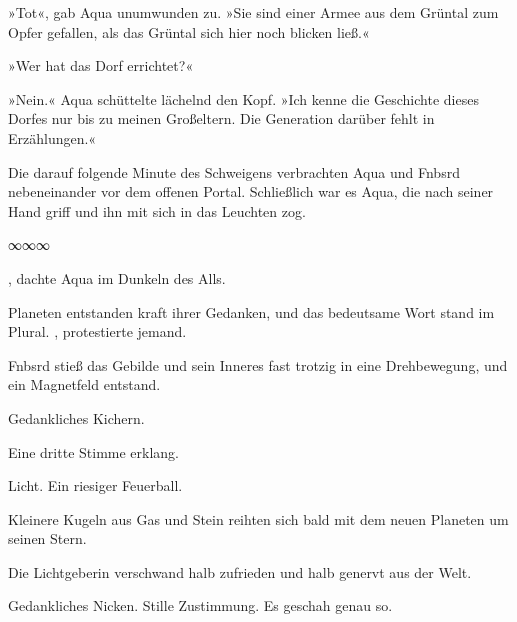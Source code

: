 »Tot«, gab Aqua unumwunden zu. »Sie sind einer Armee aus dem Grüntal zum Opfer gefallen, als das Grüntal sich hier noch blicken ließ.«

»Wer hat das Dorf errichtet?«

»Nein.« Aqua schüttelte lächelnd den Kopf. »Ich kenne die Geschichte dieses Dorfes nur bis zu meinen Großeltern. Die Generation darüber fehlt in Erzählungen.«

Die darauf folgende Minute des Schweigens verbrachten Aqua und Fnbsrd nebeneinander vor dem offenen Portal. Schließlich war es Aqua, die nach seiner Hand griff und ihn mit sich in das Leuchten zog.

\begin{center}
∞∞∞
\end{center}

, dachte Aqua im Dunkeln des Alls. 

Planeten entstanden kraft ihrer Gedanken, und das bedeutsame Wort stand im Plural. , protestierte jemand. 


 Fnbsrd stieß das Gebilde und sein Inneres fast trotzig in eine Drehbewegung, und ein Magnetfeld entstand. 

Gedankliches Kichern. 

Eine dritte Stimme erklang. 


 Licht. Ein riesiger Feuerball.


Kleinere Kugeln aus Gas und Stein reihten sich bald mit dem neuen Planeten um seinen Stern.


Die Lichtgeberin verschwand halb zufrieden und halb genervt aus der Welt.


Gedankliches Nicken. Stille Zustimmung. Es geschah genau so.

